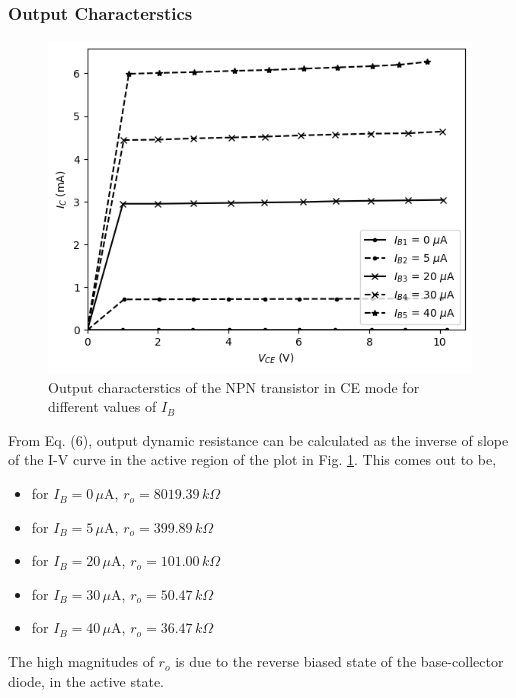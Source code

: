     \subsubsection*{\textbf{Output Characterstics}} 

    \begin{figure}[H]
        \centering
        \includegraphics[width=1\columnwidth]{images/g2.png}
        \caption{Output characterstics of the NPN transistor in CE mode for different values of $I_{B}$}
        \label{graph:2}
    \end{figure}

  

    From Eq. (6), output dynamic resistance can be calculated as the inverse of slope of the I-V curve in the active region of the plot in Fig. \ref{graph:2}. This comes out to be, 

    \begin{itemize}
        \item for $I_B=0\,\mu$A, $r_o=8019.39\,k\Omega$ 
        \item for $I_B=5\,\mu$A, $r_o=399.89\,k\Omega$ 
        \item for $I_B=20\,\mu$A, $r_o=101.00\,k\Omega$ 
        \item for $I_B=30\,\mu$A, $r_o=50.47\,k\Omega$ 
        \item for $I_B=40\,\mu$A, $r_o=36.47\,k\Omega$ 
    \end{itemize}

    The high magnitudes of $r_o$ is due to the reverse biased state of the base-collector diode, in the active state.

